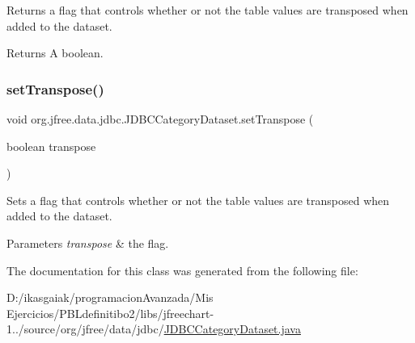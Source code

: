 Returns a flag that controls whether or not the table values are transposed when added to the dataset.

\begin{DoxyReturn}{Returns}
A boolean. 
\end{DoxyReturn}
\mbox{\label{classorg_1_1jfree_1_1data_1_1jdbc_1_1_j_d_b_c_category_dataset_a55b7021af40abd87ba5f54623da2174d}} 
\subsubsection{\texorpdfstring{set\+Transpose()}{setTranspose()}}
{\footnotesize\ttfamily void org.\+jfree.\+data.\+jdbc.\+J\+D\+B\+C\+Category\+Dataset.\+set\+Transpose (\begin{DoxyParamCaption}\item[{boolean}]{transpose }\end{DoxyParamCaption})}

Sets a flag that controls whether or not the table values are transposed when added to the dataset.


\begin{DoxyParams}{Parameters}
{\em transpose} & the flag. \\
\hline
\end{DoxyParams}


The documentation for this class was generated from the following file\+:\begin{DoxyCompactItemize}
\item 
D\+:/ikasgaiak/programacion\+Avanzada/\+Mis Ejercicios/\+P\+B\+Ldefinitibo2/libs/jfreechart-\/1../source/org/jfree/data/jdbc/\mbox{\hyperlink{_j_d_b_c_category_dataset_8java}{J\+D\+B\+C\+Category\+Dataset.\+java}}\end{DoxyCompactItemize}
